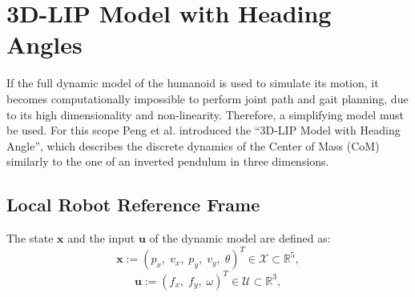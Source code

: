 \section{3D-LIP Model with Heading Angles}\label{sec:lip}
If the full dynamic model of the humanoid is used to simulate its motion, it becomes computationally impossible to perform joint path and gait planning, due to its high dimensionality and non-linearity. Therefore, a simplifying model must be used. For this scope Peng et al. introduced the ``3D-LIP Model with Heading Angle'', which describes the discrete dynamics of the Center of Mass (CoM) similarly to the one of an inverted pendulum in three dimensions.

\subsection{Local Robot Reference Frame}
The state $\mathbf{x}$ and the input $\mathbf{u}$ of the dynamic model are defined as:
$$ \mathbf{x} := \left( p_x,\; v_x,\; p_y,\; v_y,\; \theta \right)^T \in \mathcal{X} \subset \mathbb{R}^5 , $$
$$ \mathbf{u} := \left( f_x,\; f_y,\; \omega \right)^T \in \mathcal{U} \subset \mathbb{R}^3 , $$

